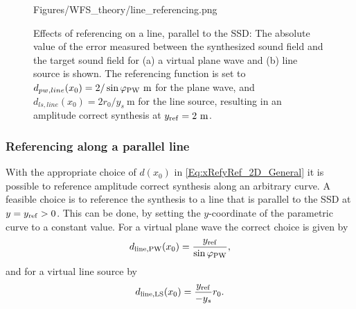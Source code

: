\begin{figure}
	\centering
	\begin{overpic}[width = .85\columnwidth ]{Figures/WFS_theory/line_referencing.png}
	\scriptsize
	\end{overpic}
\caption{Effects of referencing on a line, parallel to the SSD: The absolute value of the error measured between the synthesized sound field and the target sound field for (a) a virtual plane wave and (b) line source is shown.
The referencing function is set to $d_{pw,line}(x_0) = 2 / \sin\varphi_\text{PW} ~\mathrm{m}$ for the plane wave, and $d_{ls,line}(x_0) = 2 r_0/y_s ~\mathrm{m}$ for the line source, resulting in an amplitude correct synthesis at $y_{\mathrm{ref}} = 2~\mathrm{m}$.}
	\label{Fig:Theory:line_referencing}
\end{figure}
\subsubsection{Referencing along a parallel line}
With the appropriate choice of $d(x_0)$ in \eqref{Eq:xRefyRef_2D_General} it is possible to reference amplitude correct synthesis along an arbitrary curve.
A feasible choice is to reference the synthesis to a line that is parallel to the SSD at $y=y_{\mathrm{ref}}>0$.
This can be done, by setting the $y$-coordinate of the parametric curve to a constant value.
For a virtual plane wave the correct choice is given by
\begin{equation}
d_\text{line,PW}(x_0) = \frac{y_{\mathrm{ref}}}{\sin\varphi_\text{PW}},
\end{equation}
and for a virtual line source by
\begin{equation}
d_\text{line,LS}(x_0) = \frac{y_{\mathrm{ref}}}{-y_s} r_0.
\end{equation}

